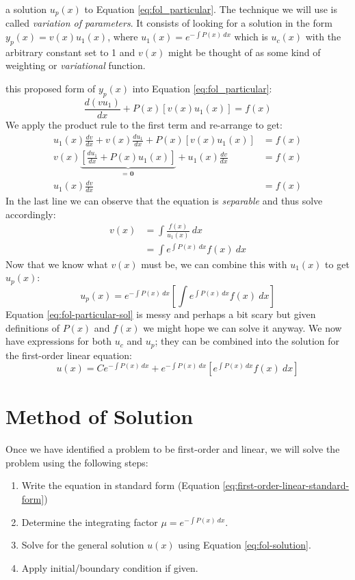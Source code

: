  a solution $u_p(x)$ to Equation \ref{eq:fol_particular}.  The technique we will use is called \emph{variation of parameters}.  It consists of looking for a solution in the form $y_p(x) = v(x)u_1(x)$, where $u_1(x) = e^{-\int P(x) \ dx}$ which is $u_c(x)$ with the arbitrary constant set to 1 and $v(x)$ might be thought of as some kind of weighting or \emph{variational} function.

 this proposed form of $y_p(x)$ into Equation \ref{eq:fol_particular}:
\begin{equation*}
\frac{d(vu_1)}{dx} + P(x)\left[v(x)u_1(x)\right]=f(x)
\end{equation*}
We apply the product rule to the first term and re-arrange to get:
\begin{align*}
u_1(x)\frac{dv}{dx}+ v(x)\frac{du_1}{dx} + P(x)\left[v(x)u_1(x)\right] &= f(x) \\
v(x)\underbrace{\left[\frac{du_1}{dx}+P(x)u_1(x) \right]}_{\textbf{= 0}}+u_1(x)\frac{dv}{dx} &= f(x) \\
u_1(x)\frac{dv}{dx} &= f(x)
\end{align*}
In the last line we can observe that the equation is \emph{separable} and thus solve accordingly:
\begin{align*}
v(x) &= \int \frac{f(x)}{u_1(x)} \ dx \\
     &= \int e^{\int P(x) \ dx}f(x) \ dx
\end{align*}
Now that we know what $v(x)$ must be, we can combine this with $u_1(x)$ to get $u_p(x)$:
\begin{equation}
u_p(x) = e^{-\int P(x) \ dx}\left[\int e^{\int P(x) \ dx}f(x) \ dx \right]
\label{eq:fol-particular-sol}
\end{equation}
Equation \ref{eq:fol-particular-sol} is messy and perhaps a bit scary but given definitions of $P(x)$ and $f(x)$ we might hope we can solve it anyway.  We now have expressions for both $u_c$ and $u_p$; they can be combined into the solution for the first-order linear equation:
\begin{equation}
u(x) = Ce^{-\int P(x) \ dx} + e^{-\int P(x) \ dx} \left[e^{\int P(x) \ dx} f(x) \ dx \right]
\label{eq:fol-solution}
\end{equation}

\section{Method of Solution}
Once we have identified a problem to be first-order and linear, we will solve the problem using the following steps:
\begin{enumerate}
\item Write the equation in standard form (Equation \ref{eq:first-order-linear-standard-form})
\item Determine the integrating factor $\mu = e^{-\int P(x) \ dx}$.
\item Solve for the general solution $u(x)$ using Equation \ref{eq:fol-solution}.
\item Apply initial/boundary condition if given.
\end{enumerate}

